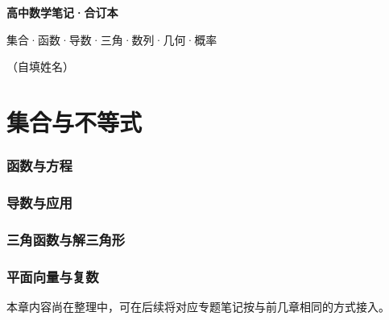 \documentclass[a4paper,11pt]{ctexart}
\renewcommand{\notetitle}{高中数学笔记·合订本}
\renewcommand{\noteauthor}{（自填姓名）}
\renewcommand{\notesubtitle}{集合·函数·导数·三角·数列·几何·概率}
\newcommand{\InputMathNoteAsSubsections}[1]{%
  \begingroup
    \let\MathNoteOrigSection\section
    \let\MathNoteOrigSubsection\subsection
    \let\MathNoteOrigSubsubsection\subsubsection
    \renewcommand{\section}{\subsection}
    \renewcommand{\subsection}{\subsubsection}
  \endgroup
}
\begin{document}
\thispagestyle{empty}
\setcounter{page}{1}

\noindent
\begin{minipage}[t][0.7\textheight][c]{\textwidth}
  \raggedleft
  \vspace*{\fill}
  {\sffamily\bfseries\Huge\color{accent}\notetitle\par}
  \vspace{0.6em}
  {\Large\color{inkgray}\notesubtitle\par}
  \vspace{0.5em}
  {\large\color{inkgray}\noteauthor\par}
  \vspace{0.4em}
  \MathNoteVersionBlock
  \vspace*{\fill}
\end{minipage}

\clearpage
\thispagestyle{plain}
\setcounter{tocdepth}{2}
\tableofcontents

\clearpage

\section{集合与不等式}
\InputMathNoteAsSubsections{集合与不等式.tex}

\section{函数与方程}
\InputMathNoteAsSubsections{函数与方程.tex}

\section{导数与应用}
\InputMathNoteAsSubsections{高中数学-导数与微积分.tex}

\section{三角函数与解三角形}
\InputMathNoteAsSubsections{三角函数与解三角形.tex}

\section{平面向量与复数}
本章内容尚在整理中，可在后续将对应专题笔记按与前几章相同的方式接入。

\end{document}
